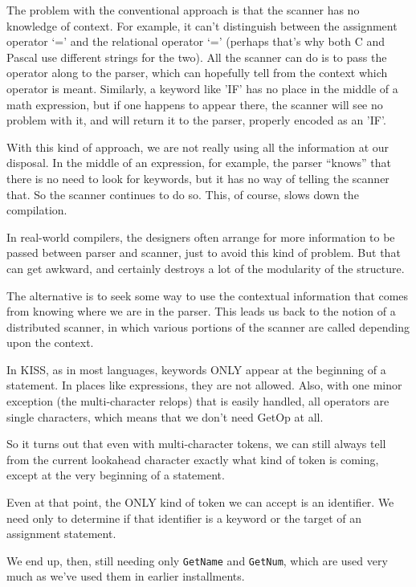 The problem with the  conventional  approach  is that the scanner has no knowledge of context. For example, it  can't distinguish between the assignment operator `=' and  the  relational operator `=' (perhaps that's why both C and Pascal  use  different strings for the  two). All  the scanner can do is to pass the operator along  to  the  parser, which can hopefully tell from the context which operator is meant. Similarly, a keyword like 'IF' has no place in the middle of a  math  expression, but if one happens to appear there, the scanner  will  see no problem with it, and will return it to the parser, properly encoded as an 'IF'.

With this  kind  of  approach, we  are  not really using all the information at our disposal. In the middle of an expression, for example, the parser  ``knows''  that  there  is no need to look for keywords, but it has no way of telling the scanner that. So the scanner  continues to do so. This, of  course, slows  down  the compilation.

In real-world compilers, the  designers  often  arrange  for more information  to be passed between parser  and  scanner, just  to avoid  this  kind of problem. But  that  can  get  awkward, and certainly destroys a lot of the modularity of the structure.

The  alternative  is  to seek some  way  to  use  the  contextual information that comes from knowing where we are  in  the parser. This leads us  back  to  the  notion of a distributed scanner, in which various portions  of  the scanner are called depending upon the context.

In KISS, as  in  most  languages, keywords  ONLY  appear  at the beginning of a statement. In places like  expressions, they are not allowed. Also, with one minor exception (the multi-character relops)  that  is  easily  handled, all  operators   are  single characters, which means that we don't need GetOp at all.

So it turns out  that  even  with  multi-character tokens, we can still always tell from the  current  lookahead  character exactly what kind of token is coming, except  at the very beginning of a statement.

Even at that point, the ONLY  kind  of  token we can accept is an identifier. We need only to determine if that  identifier  is  a keyword or the target of an assignment statement.

We end up, then, still needing only {\tt GetName} and {\tt GetNum}, which are used very much as we've used them in earlier installments.

